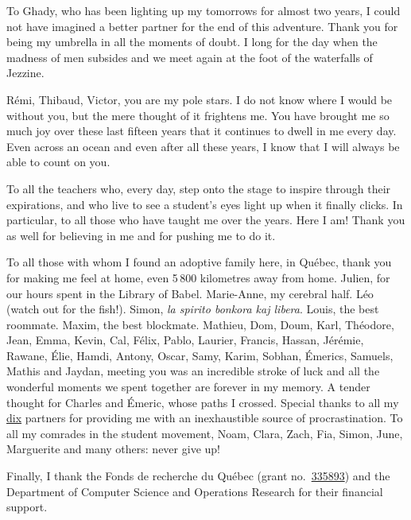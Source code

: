 To Ghady, who has been lighting up my tomorrows for almost two years, I could not have imagined a better partner for the end of this adventure.
Thank you for being my umbrella in all the moments of doubt.
I long for the day when the madness of men subsides and we meet again at the foot of the waterfalls of Jezzine.

Rémi, Thibaud, Victor, you are my pole stars.
I do not know where I would be without you, but the mere thought of it frightens me.
You have brought me so much joy over these last fifteen years that it continues to dwell in me every day.
Even across an ocean and even after all these years, I know that I will always be able to count on you.

To all the teachers who, every day, step onto the stage to inspire through their expirations, and who live to see a student’s eyes light up when it finally clicks.
In particular, to all those who have taught me over the years.
Here I am!
Thank you as well for believing in me and for pushing me to do it.

To all those with whom I found an adoptive family here, in Québec, thank you for making me feel at home, even 5\,800 kilometres away from home.
Julien, for our hours spent in the Library of Babel.
Marie-Anne, my cerebral half.
Léo (watch out for the fish!).
Simon, \emph{la spirito bonkora kaj libera}.
Louis, the best roommate.
Maxim, the best blockmate.
Mathieu, Dom, Doum, Karl, Théodore, Jean, Emma, Kevin, Cal, Félix, Pablo, Laurier, Francis, Hassan, Jérémie, Rawane, Élie, Hamdi, Antony, Oscar, Samy, Karim, Sobhan, Émerics, Samuels, Mathis and Jaydan, meeting you was an incredible stroke of luck and all the wonderful moments we spent together are forever in my memory.
A tender thought for Charles and Émeric, whose paths I crossed.
Special thanks to all my \href{https://wiki.aediroum.ca/wiki/Jeu_du_10}{dix} partners for providing me with an inexhaustible source of procrastination.
To all my comrades in the student movement, Noam, Clara, Zach, Fia, Simon, June, Marguerite and many others: never give up!

Finally, I thank the Fonds de recherche du Québec (grant no.~\href{https://doi.org/10.69777/335893}{335893}) and the Department of Computer Science and Operations Research for their financial support.

